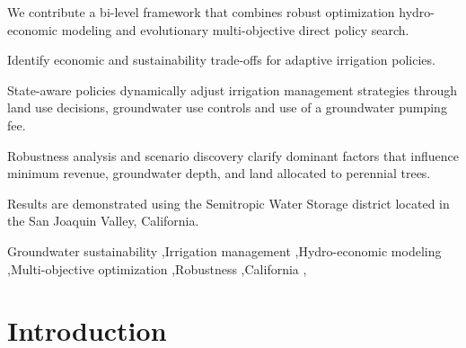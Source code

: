 \documentclass[a4paper,fleqn]{cas-sc}
\begin{document}
\begin{highlights}
\item We contribute a bi-level framework that combines robust optimization hydro-economic modeling and evolutionary multi-objective direct policy search.
\item Identify economic and sustainability trade-offs for adaptive irrigation policies.
\item State-aware policies dynamically adjust irrigation management strategies through land use decisions, groundwater use controls and use of a groundwater pumping fee.
\item Robustness analysis and scenario discovery clarify dominant factors that influence minimum revenue, groundwater depth, and land allocated to perennial trees.
\item Results are demonstrated using the Semitropic Water Storage district located in the San Joaquin Valley, California.
\end{highlights}

\begin{keywords}
Groundwater sustainability \sep Irrigation management \sep Hydro-economic modeling \sep Multi-objective optimization \sep Robustness \sep California \sep 
\end{keywords}


\maketitle

\section{Introduction}\label{sct:1}
\end{document}
